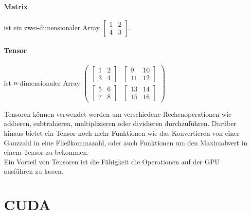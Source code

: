 \paragraph*{Matrix} ist ein zwei-dimensionaler Array $\begin{bmatrix}
	1 & 2 \\
	4 & 3  
\end{bmatrix}$.
\paragraph*{Tensor} ist $n$-dimensionaler Array $\begin{pmatrix}
 \begin{bmatrix} 1 & 2 \\	3 & 4  \end{bmatrix} &  \begin{bmatrix} 9 & 10 \\ 11 & 12  \end{bmatrix}\\
\begin{bmatrix}	5 & 6 \\	7 & 8  \end{bmatrix} &  \begin{bmatrix} 13 & 14 \\ 15 & 16  \end{bmatrix}
\end{pmatrix}$

Tensoren können verwendet werden um verschiedene Rechenoperationen wie addieren, subtrahieren, multiplizieren oder dividieren durchzuführen. Darüber hinaus bietet ein Tensor noch mehr Funktionen wie das Konvertieren von einer Ganzzahl in eine Fließkommazahl, oder auch Funktionen um den Maximalwert in einem Tensor zu bekommen. \\
Ein Vorteil von Tensoren ist die Fähigkeit die Operationen auf der \ac{GPU} ausführen zu lassen. \cite[vgl.][]{PapaJoe}



\section{CUDA}
